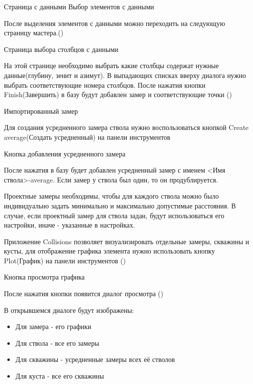 {Страница с данными}
{Выбор элементов с данными}

После выделения элементов с данными можно переходить на следующую страницу мастера.()

{Страница выбора столбцов с данными}

На этой странице необходимо выбрать какие столбцы содержат нужные данные(глубину, зенит и азимут). В выпадающих списках вверху диалога нужно выбрать соответствующие номера столбцов.
После нажатия кнопки Finish(Завершить) в базу будут добавлен замер и соответствующие точки ()

{Импортированный замер}

Для создания усредненного замера ствола нужно воспользоваться кнопкой Create average(Создать усредненный) на панели инструментов

{Кнопка добавления усредненного замера}

После нажатия в базу будет добавлен усредненный замер с именем <Имя ствола>-average. Если замер у ствола был один, то он продублируется.

Проектные замеры необходимы, чтобы для каждого ствола можно было индивидуально задать минимально и максимально допустимые расстояния.
В случае, если проектный замер для ствола задан, будут использоваться его настройки, иначе - указанные в настройках.

Приложение Collisions позволяет визуализировать отдельные замеры, скважины и кусты, для отображение графика
элемента нужно использовать кнопку Plot(График) на панели инструментов
()

{Кнопка просмотра графика}

После нажатия кнопки появится диалог просмотра ()


В открывшемся диалоге будут изображены:
\begin{itemize}
  \item Для замера - его графики
  \item Для ствола - все его замеры
  \item Для скважины - усредненные замеры всех её стволов
  \item Для куста - все его скважины
\end{itemize}

